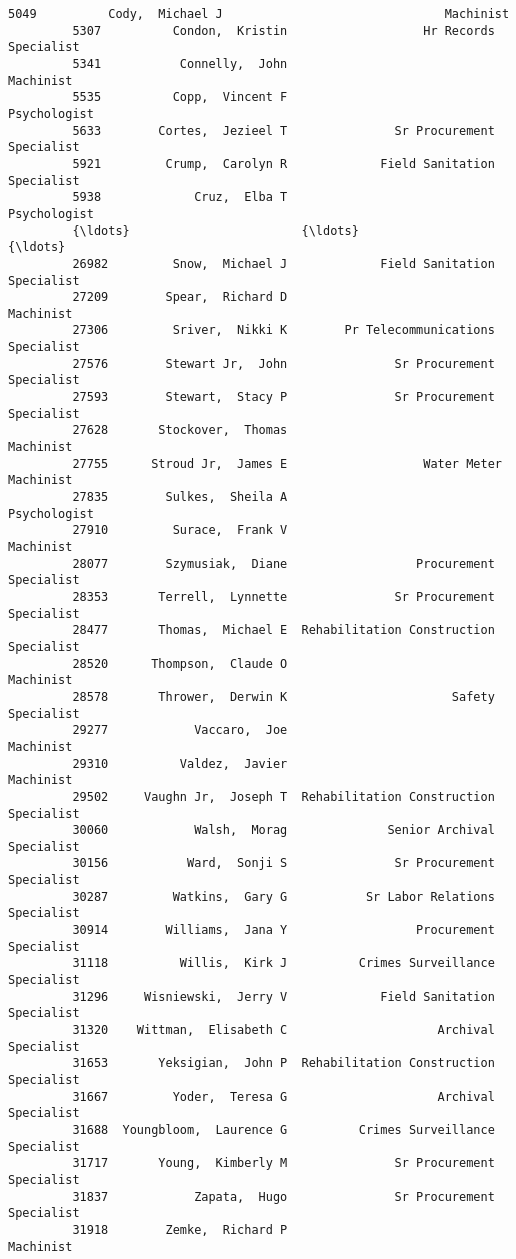 \documentclass[11pt]{article}
\begin{document}
\begin{Verbatim}[commandchars=\\\{\}]
         5049          Cody,  Michael J                               Machinist   
         5307          Condon,  Kristin                   Hr Records Specialist   
         5341           Connelly,  John                               Machinist   
         5535          Copp,  Vincent F                            Psychologist   
         5633        Cortes,  Jezieel T               Sr Procurement Specialist   
         5921         Crump,  Carolyn R             Field Sanitation Specialist   
         5938             Cruz,  Elba T                            Psychologist   
         {\ldots}                        {\ldots}                                     {\ldots}   
         26982         Snow,  Michael J             Field Sanitation Specialist   
         27209        Spear,  Richard D                               Machinist   
         27306         Sriver,  Nikki K        Pr Telecommunications Specialist   
         27576        Stewart Jr,  John               Sr Procurement Specialist   
         27593        Stewart,  Stacy P               Sr Procurement Specialist   
         27628       Stockover,  Thomas                               Machinist   
         27755      Stroud Jr,  James E                   Water Meter Machinist   
         27835        Sulkes,  Sheila A                            Psychologist   
         27910         Surace,  Frank V                               Machinist   
         28077        Szymusiak,  Diane                  Procurement Specialist   
         28353       Terrell,  Lynnette               Sr Procurement Specialist   
         28477       Thomas,  Michael E  Rehabilitation Construction Specialist   
         28520      Thompson,  Claude O                               Machinist   
         28578       Thrower,  Derwin K                       Safety Specialist   
         29277            Vaccaro,  Joe                               Machinist   
         29310          Valdez,  Javier                               Machinist   
         29502     Vaughn Jr,  Joseph T  Rehabilitation Construction Specialist   
         30060            Walsh,  Morag              Senior Archival Specialist   
         30156           Ward,  Sonji S               Sr Procurement Specialist   
         30287         Watkins,  Gary G           Sr Labor Relations Specialist   
         30914        Williams,  Jana Y                  Procurement Specialist   
         31118          Willis,  Kirk J          Crimes Surveillance Specialist   
         31296     Wisniewski,  Jerry V             Field Sanitation Specialist   
         31320    Wittman,  Elisabeth C                     Archival Specialist   
         31653       Yeksigian,  John P  Rehabilitation Construction Specialist   
         31667         Yoder,  Teresa G                     Archival Specialist   
         31688  Youngbloom,  Laurence G          Crimes Surveillance Specialist   
         31717       Young,  Kimberly M               Sr Procurement Specialist   
         31837            Zapata,  Hugo               Sr Procurement Specialist   
         31918        Zemke,  Richard P                               Machinist   
         

\end{Verbatim}
\end{document}
